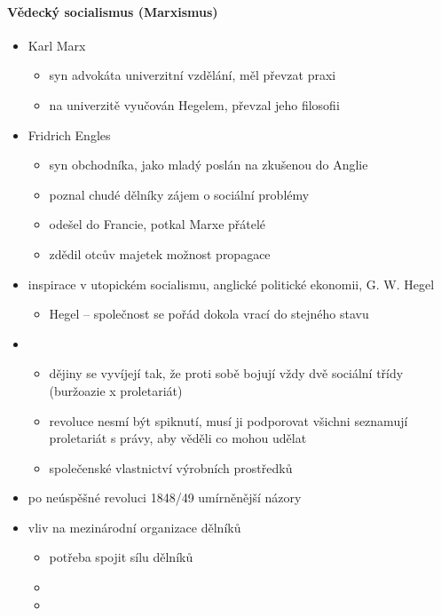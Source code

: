 \paragraph{Vědecký socialismus (Marxismus)}
\begin{itemize}
\item Karl Marx
	\begin{itemize}
	\item syn advokáta \ra univerzitní vzdělání, měl převzat praxi
	\item na univerzitě vyučován Hegelem, převzal jeho filosofii
	\end{itemize}
\item Fridrich Engles
	\begin{itemize}
	\item syn obchodníka, jako mladý poslán na zkušenou do Anglie
	\item poznal chudé dělníky \ra zájem o sociální problémy
	\item odešel do Francie, potkal Marxe \ra přátelé
	\item zdědil otcův majetek \ra možnost propagace
	\end{itemize}
\item inspirace v utopickém socialismu, anglické politické ekonomii, G. W. Hegel
	\begin{itemize}
	\item Hegel -- společnost se pořád dokola vrací do stejného stavu
	\end{itemize}
\item {}
	\begin{itemize}
	\item dějiny se vyvíjejí tak, že proti sobě bojují vždy dvě sociální třídy (buržoazie x proletariát)
	\item revoluce nesmí být spiknutí, musí ji podporovat všichni \ra seznamují proletariát s právy, aby věděli co mohou udělat
	\item společenské vlastnictví výrobních prostředků
	\end{itemize}
\item po neúspěšné revoluci 1848/49 umírněnější názory
\item vliv na mezinárodní organizace dělníků
	\begin{itemize}
	\item potřeba spojit sílu dělníků
	\item {}
	\item {}

\end{itemize}
\end{itemize}
